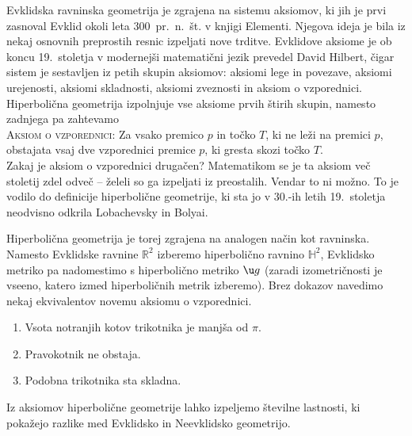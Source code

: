\documentclass[a4paper]{article}
\begin{document}
Evklidska ravninska geometrija je zgrajena na sistemu aksiomov, ki jih je prvi zasnoval Evklid okoli leta 300~pr.~n.~št. v knjigi Elementi. Njegova ideja je bila iz nekaj osnovnih preprostih resnic izpeljati nove trditve. Evklidove aksiome je ob koncu 19.~stoletja v modernejši matematični jezik prevedel David Hilbert, čigar sistem je sestavljen iz petih skupin aksiomov: aksiomi lege in povezave, aksiomi urejenosti, aksiomi skladnosti, aksiomi zveznosti in aksiom o vzporednici.
Hiperbolična geometrija izpolnjuje vse aksiome prvih štirih skupin, namesto zadnjega pa zahtevamo \\[0.35cm]
\textsc{Aksiom o vzporednici}: Za vsako premico $p$ in točko $T$, ki ne leži na premici $p$, obstajata vsaj dve vzporednici premice $p$, ki gresta skozi točko $T$. \\[0.35cm]
Zakaj je aksiom o vzporednici drugačen? Matematikom se je ta aksiom več stoletij zdel odveč -- želeli so ga izpeljati iz preostalih. Vendar to ni možno. To je vodilo do definicije hiperbolične geometrije, ki sta jo v 30.-ih letih 19.~stoletja neodvisno odkrila Lobachevsky in Bolyai.

Hiperbolična geometrija je torej zgrajena na analogen način kot ravninska. Namesto Evklidske ravnine $\mathbb{R}^2$ izberemo hiperbolično ravnino $\mathbb{H}^2$, Evklidsko metriko pa nadomestimo s hiperbolično metriko $\u g$ (zaradi izometričnosti je vseeno, katero izmed hiperboličnih metrik izberemo).
Brez dokazov navedimo nekaj ekvivalentov novemu aksiomu o vzporednici.
\begin{enumerate}
\item Vsota notranjih kotov trikotnika je manjša od $\pi$.
\item Pravokotnik ne obstaja.
\item Podobna trikotnika sta skladna.
\end{enumerate}
Iz aksiomov hiperbolične geometrije lahko izpeljemo številne lastnosti, ki pokažejo razlike med Evklidsko in Neevklidsko geometrijo.
\end{document}
